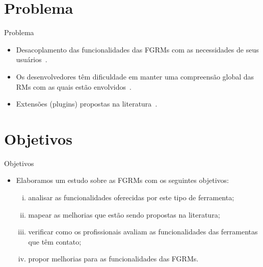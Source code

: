 \documentclass[t,14pt,mathserif]{beamer}
\begin{document}
\section{Problema}

\begin{frame}{Problema}
	\begin{itemize}

        \item Desacoplamento das funcionalidades das FGRMs com as necessidades
              de seus usuários~\cite{baysal2012qualitative, just2008towards}.

          \item Os desenvolvedores têm dificuldade em manter uma compreensão
              global das RMs com as quais estão
              envolvidos~\cite{Baysal:2013:SAP:2486788.2486957}.

        \item Extensões (plugins) propostas na
              literatura~\cite{101186,Thung:2014:BIT:2635868.2661678,Kononenko:2014:DED:2591062.2591075}.
	\end{itemize}
\end{frame}

\section{Objetivos}

\begin{frame}{Objetivos}
	\begin{itemize}
        \item Elaboramos um estudo sobre as FGRMs com os seguintes objetivos:
            \begin{enumerate}[(i)]
                \item analisar as funcionalidades oferecidas por este tipo de
                      ferramenta;
                \item mapear as melhorias que estão sendo propostas na
                    literatura;
                \item verificar como os profissionais avaliam as
                      funcionalidades das ferramentas que têm contato;
                \item propor melhorias para as funcionalidades das FGRMs\@.
            \end{enumerate}
	\end{itemize}
\end{frame}
\end{document}
